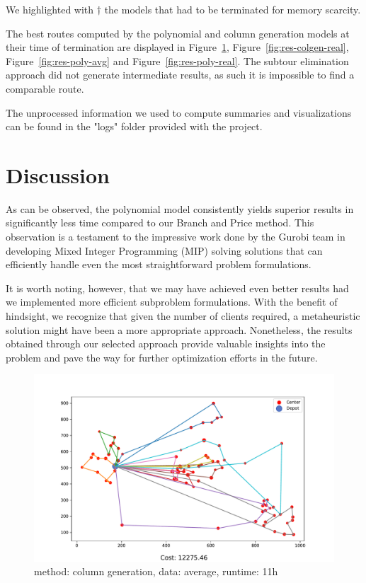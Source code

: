 We highlighted with $\dagger$ the models that had to be terminated for memory scarcity.

The best routes computed by the polynomial and column generation models at their time of termination are displayed in Figure~\ref{fig:res-colgen-avg}, Figure~\ref{fig:res-colgen-real}, Figure~\ref{fig:res-poly-avg} and Figure~\ref{fig:res-poly-real}. The subtour elimination approach did not generate intermediate results, as such it is impossible to find a comparable route.

The unprocessed information we used to compute summaries and visualizations can be found in the "logs" folder provided with the project.

\section{Discussion}
As can be observed, the polynomial model consistently yields superior results in significantly less time compared to our Branch and Price method. This observation is a testament to the impressive work done by the Gurobi team in developing Mixed Integer Programming (MIP) solving solutions that can efficiently handle even the most straightforward problem formulations.

It is worth noting, however, that we may have achieved even better results had we implemented more efficient subproblem formulations. With the benefit of hindsight, we recognize that given the number of clients required, a metaheuristic solution might have been a more appropriate approach. Nonetheless, the results obtained through our selected approach provide valuable insights into the problem and pave the way for further optimization efforts in the future.



\begin{figure}[tb]
    \centering
    \includegraphics[width=1\columnwidth]{figures/results_colgen_avg.pdf}
    \caption{method: column generation, data: average, runtime: 11h}
  \label{fig:res-colgen-avg}
\end{figure}

